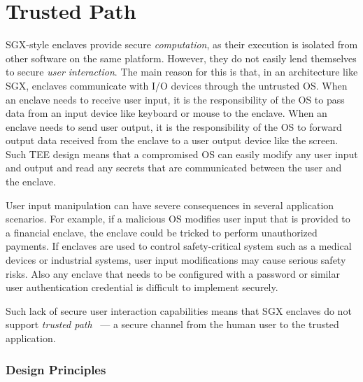 
\section*{Trusted Path}

SGX-style enclaves provide secure \emph{computation}, as their execution is isolated from other software on the same platform. However, they do not easily lend themselves to secure \emph{user interaction}. The main reason for this is that, in an architecture like SGX, enclaves communicate with I/O devices through the untrusted OS. When an enclave needs to receive user input, it is the responsibility of the OS to pass data from an input device like keyboard or mouse to the enclave. When an enclave needs to send user output, it is the responsibility of the OS to forward output data received from the enclave to a user output device like the screen. Such TEE design means that a compromised OS can easily modify any user input and output and read any secrets that are communicated between the user and the enclave. 

User input manipulation can have severe consequences in several application scenarios. For example, if a malicious OS modifies user input that is provided to a financial enclave, the enclave could be tricked to perform unauthorized payments. If enclaves are used to control safety-critical system such as a medical devices or industrial systems, user input modifications may cause serious safety risks. Also any enclave that needs to be configured with a password or similar user authentication credential is difficult to implement securely.

Such lack of secure user interaction capabilities means that SGX enclaves do not support \emph{trusted path}~\cite{x86} --- a secure channel from the human user to the trusted application. 



\subsubsection*{Design Principles}

